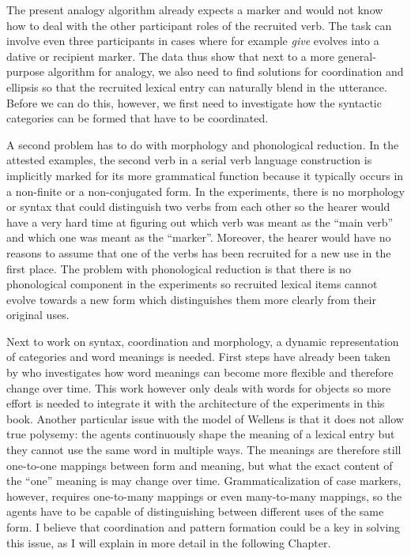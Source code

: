 The present analogy algorithm already expects a marker and would not know how to deal with the other participant roles of the recruited verb. The task can involve even three participants in cases where for example {\em give} evolves into a dative or recipient marker. The data thus show that next to a more general-purpose algorithm for analogy, we also need to find solutions for coordination and ellipsis so that the recruited lexical entry can naturally blend in the utterance. Before we can do this, however, we first need to investigate how the syntactic categories can be formed that have to be coordinated.

A second problem has to do with morphology and phonological reduction. In the attested examples, the second verb in a serial verb language construction is implicitly marked for its more grammatical function because it typically occurs in a non-finite or a non-conjugated form. In the experiments, there is no morphology or syntax that could distinguish two verbs from each other so the hearer would have a very hard time at figuring out which verb was meant as the ``main verb'' and which one was meant as the ``marker''. Moreover, the hearer would have no reasons to assume that one of the verbs has been recruited for a new use in the first place. The problem with phonological reduction is that there is no phonological component in the experiments so recruited lexical items cannot evolve towards a new form which distinguishes them more clearly from their original uses.

Next to work on syntax, coordination and morphology, a dynamic representation of categories and word meanings is needed. First steps have already been taken by \citet{wellens08coping} who investigates how word meanings can become more flexible and therefore change over time. This work however only deals with words for objects so more effort is needed to integrate it with the architecture of the experiments in this book. Another particular issue with the model of Wellens is that it does not allow true polysemy: the agents continuously shape the meaning of a lexical entry but they cannot use the same word in multiple ways. The meanings are therefore still one-to-one mappings between form and meaning, but what the exact content of the ``one'' meaning is may change over time. Grammaticalization of case markers, however, requires one-to-many mappings or even many-to-many mappings, so the agents have to be capable of distinguishing between different uses of the same form. I believe that coordination and pattern formation could be a key in solving this issue, as I will explain in more detail in the following Chapter.
